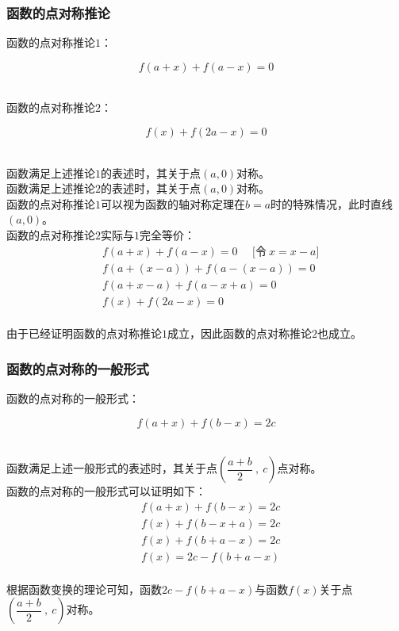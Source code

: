 \documentclass[UTF8]{ctexart}
\begin{document}
\subsubsection{函数的点对称推论}
    \setcounter{equation}{0}
    函数的点对称推论$1$：
    \begin{large}
        \begin{equation*}
            f(a+x)+f(a-x)=0
        \end{equation*}
    \end{large}\\
    函数的点对称推论$2$：
    \begin{large}
        \begin{equation*}
            f(x)+f(2a-x)=0
        \end{equation*}
    \end{large}\\
    函数满足上述推论$1$的表述时，其关于点$(a,0)$对称。\\[3mm]
    函数满足上述推论$2$的表述时，其关于点$(a,0)$对称。\\[3mm]
    函数的点对称推论$1$可以视为函数的轴对称定理在$b=a$时的特殊情况，此时直线$(a,0)$。\\[3mm]
    函数的点对称推论$2$实际与$1$完全等价：\vspace{1pt}
    \begin{align}
        &f(a+x)+f(a-x)=0~~~~~~\big[\text{令}~x=x-a\big]\\[2mm]
        &f(a+(x-a))+f(a-(x-a))=0\\[2mm]
        &f(a+x-a)+f(a-x+a)=0\\[2mm]
        &f(x)+f(2a-x)=0
    \end{align}\\
    由于已经证明函数的点对称推论$1$成立，因此函数的点对称推论$2$也成立。

\newpage

\subsubsection{函数的点对称的一般形式}
    \setcounter{equation}{0}
    函数的点对称的一般形式：
    \begin{large}
        \begin{equation*}
            f(a+x)+f(b-x)=2c
        \end{equation*}
    \end{large}\\
    函数满足上述一般形式的表述时，其关于点$\left(\dfrac{a+b}{2}~,~c\right)$点对称。\\[3mm]
    函数的点对称的一般形式可以证明如下：
    \begin{align}
        &f(a+x)+f(b-x)=2c\\[2mm]
        &f(x)+f(b-x+a)=2c\\[2mm]
        &f(x)+f(b+a-x)=2c\\[2mm]
        &f(x)=2c-f(b+a-x)
    \end{align}\\
    根据函数变换的理论可知，函数$2c-f(b+a-x)$与函数$f(x)$关于点$\left(\dfrac{a+b}{2}~,~c\right)$对称。\vspace{5pt}
\end{document}
